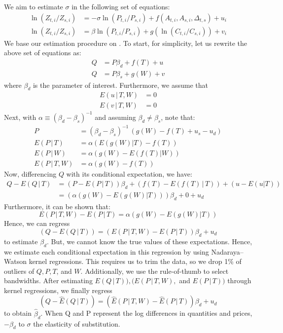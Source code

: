 \documentclass[11pt,a4paper,leqno]{extarticle}
\begin{document}
	We aim to estimate $\sigma$ in the following set of equations:
	\begin{align*}
	\ln (Z_{ t, i} / Z_{ s, i}) &= -\sigma \ln (P_{t,i} / P_{s,i}) +  f \left( A_{t,i}, A_{s,i}, \Delta_{t,s} \right) + u_i \\
	\ln (Z_{ t, i} / Z_{ s, i}) &= \beta \ln (P_{t,i} / P_{s,i}) + g \left( \ln (C_{t,i} / C_{s,i})  \right) + v_{i}
	\end{align*}
	We base our estimation procedure on \citet{Newey}. To start, for simplicity, let us rewrite the above set of equations as:
	\begin{align*}
	Q &= P \beta_d + f(T) + u \\
	Q &= P \beta_s + g(W) + v 
	\end{align*}
	where $\beta_d$ is the parameter of interest. Furthermore, we assume that 
	\begin{align*}
	E(u \, | \, T, W) &= 0 \\
	E(v \, | \, T, W) &= 0 
	\end{align*}
	Next, with $\alpha \equiv (\beta_d - \beta_s)^{-1}$ and assuming $\beta_d \neq \beta_s$, note that:
	\begin{align*}
	P &= (\beta_d - \beta_s)^{-1} \, \left(  g(W) - f(T) + u_s - u_d \right)  \\
	E(P\,|\,T)   &= \alpha \left( E(g(W)|T) - f(T)  \right)\\
	E(P\,|\,W)   &= \alpha \left( g(W) - E(f(T)|W)  \right) \\
	E(P\,|\,T,W) &= \alpha \left( g(W) - f(T)     \right) 
	\end{align*}
	Now, differencing $Q$ with its conditional expectation, we have:
	\begin{align*}
	Q - E(Q \,|\,T) &= (P - E(P\,|\,T))\beta_d + (f(T) - E(f(T) \,|\,T)) + (u - E(u|T))\\
	&= (\alpha(g(W) - E(g(W)|T)))\beta_d + 0 + u_d 
	\end{align*}
	Furthermore, it can be shown that:
	$$E(P\,|\,T,W) - E(P\,|\,T) = \alpha (g(W) - E(g(W)|T))$$
	Hence, we can regress 
	$$(Q - E(Q \,|\,T)) = (E(P\,|\,T,W) - E(P\,|\,T)) \beta_d + u_d $$
	to estimate $\beta_d$. But, we cannot know the true values of these expectations. Hence, we estimate each conditional expectation in this regression by using Nadaraya–Watson kernel regressions. This requires us to trim the data, so we drop 1\% of outliers of $Q, P, T$, and $W$. Additionally, we use the \citet{Silverman} rule-of-thumb to select bandwidths. After estimating $E(Q \,|\,T)), (E(P\,|\,T,W),$ and $E(P\,|\,T))$ through kernel regressions, we finally regress
	$$(Q - \hat{E}(Q \,|\,T)) = (\hat{E}(P\,|\,T,W) - \hat{E}(P\,|\,T)) \beta_d + u_d $$
	to obtain $\hat{\beta}_d$. When Q and P represent the log differences in quantities and prices, $-\beta_d$ to $\sigma$ the elasticity of substitution. 
	\pagebreak
	\pagebreak
	
\end{document}
